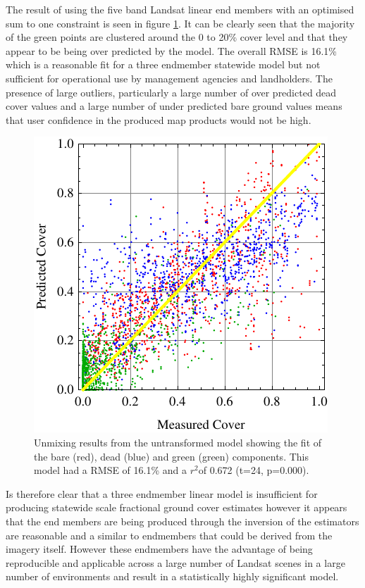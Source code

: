 \documentclass[remotesensing,article,accept,moreauthors,pdftex,12pt,a4paper]{mdpi}
\begin{document}
The result of using the five band Landsat linear end members with an optimised sum to one constraint is seen in figure \ref{fig:linearFit}. It can be clearly seen that the majority of the green points are clustered around the 0 to 20\% cover level and that they appear to be being over predicted by the model. The overall RMSE is 16.1\% which is a reasonable fit for a three endmember statewide model but not sufficient for operational use by management agencies and landholders. The presence of large outliers, particularly a large number of over predicted dead cover values and a large number of under predicted bare ground values means that user confidence in the produced map products would not be high.

\begin{figure}
\includegraphics{linearFitPlot.pdf}

\caption{\label{fig:linearFit}Unmixing results from the untransformed model showing the fit of the bare (red), dead (blue) and green (green) components. This model had a RMSE of 16.1\% and a $r^{2}$of 0.672 (t=24, p=0.000).}

\end{figure} 

Is therefore clear that a three endmember linear model is insufficient for producing statewide scale fractional ground cover estimates however it appears that the end members are being produced through the inversion of the estimators are reasonable and a similar to endmembers that could be derived from the imagery itself. However these endmembers have the advantage of being reproducible and applicable across a large number of Landsat scenes in a large number of environments and result in a statistically highly significant model. 
\end{document}
